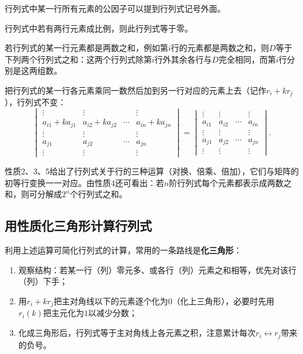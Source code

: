 \begin{corollary}
行列式中某一行所有元素的公因子可以提到行列式记号外面。
\end{corollary}

\begin{corollary}
行列式中若有两行元素成比例，则此行列式等于零。
\end{corollary}

\begin{property}
若行列式的某一行元素都是两数之和，例如第$i$行的元素都是两数之和，则$D$等于下列两个行列式之和：这两个行列式除第$i$行外其余各行与$D$完全相同，而第$i$行分别是这两组数。
\end{property}

\begin{property}
把行列式的某一行各元素乘同一数然后加到另一行对应的元素上去（记作$r_i+kr_j$），行列式不变：
\[
\begin{vmatrix}
\vdots&\vdots&&\vdots\\
a_{i1}+ka_{j1}&a_{i2}+ka_{j2}&\cdots&a_{in}+ka_{jn}\\
\vdots&\vdots&&\vdots\\
a_{j1}&a_{j2}&\cdots&a_{jn}\\
\vdots&\vdots&&\vdots
\end{vmatrix}
=\begin{vmatrix}
\vdots&\vdots&&\vdots\\
a_{i1}&a_{i2}&\cdots&a_{in}\\
\vdots&\vdots&&\vdots\\
a_{j1}&a_{j2}&\cdots&a_{jn}\\
\vdots&\vdots&&\vdots
\end{vmatrix}.
\]
\end{property}

性质2、3、5给出了行列式关于行的三种运算（对换、倍乘、倍加），它们与矩阵的初等行变换一一对应。由性质4还可看出：若$n$阶行列式每个元素都表示成两数之和，则可分解成$2^n$个行列式之和。

\subsection{用性质化三角形计算行列式}

利用上述运算可简化行列式的计算，常用的一条路线是\textbf{化三角形}：

\begin{enumerate}
\item 观察结构：若某一行（列）零元多、或各行（列）元素之和相等，优先对该行（列）下手；
\item 用$r_i+kr_j$把主对角线以下的元素逐个化为$0$（化上三角形），必要时先用$r_i(k)$把主元化为$1$以减少分数；
\item 化成三角形后，行列式等于主对角线上各元素之积，注意累计每次$r_i\leftrightarrow r_j$带来的负号。
\end{enumerate}

